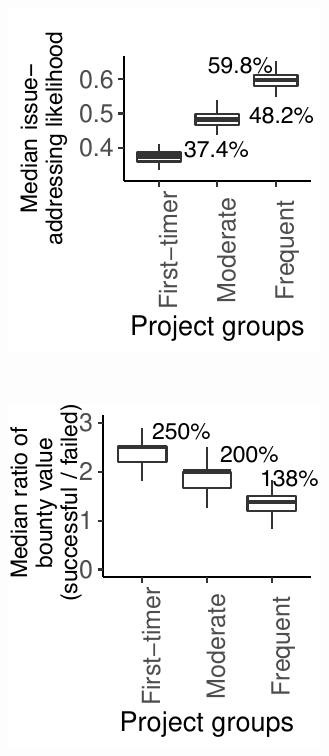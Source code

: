 \begin{figure}[t]
    \centering
    \begin{subfigure}[t]{0.45\columnwidth }
        \centering
        \includegraphics[width=\linewidth]{pics/rq1/new/rq1_likelihood_ratio500}
        \caption{}
		\label{fig:rq1_likelihood_ratio500}
    \end{subfigure}%
    ~
    \begin{subfigure}[t]{0.45\columnwidth}
        \centering
        \includegraphics[width=\linewidth]{pics/rq1/new/rq1_ratio_cp_ou500}

\end{subfigure}
\end{figure}
